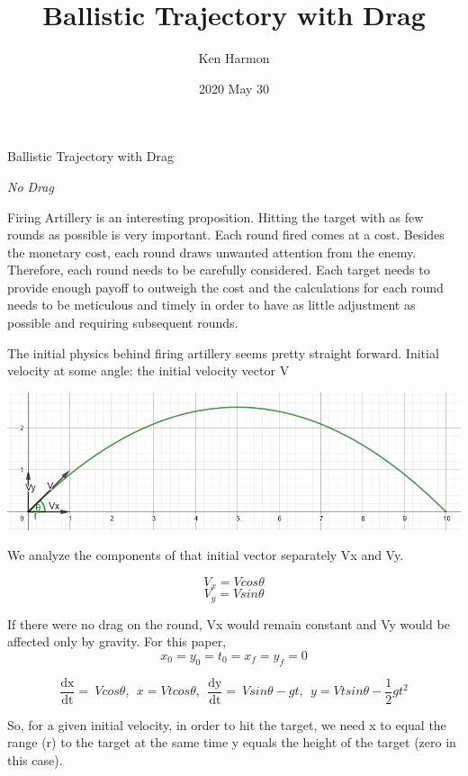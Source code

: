\documentclass[
]{article}
\title{Ballistic Trajectory with Drag}
\author{Ken Harmon}
\date{2020 May 30}
\begin{document}
\maketitle

\hypertarget{section}{%
\section{}\label{section}}

Ballistic Trajectory with Drag

\emph{No Drag}

Firing Artillery is an interesting proposition. Hitting the target with
as few rounds as possible is very important. Each round fired comes at a
cost. Besides the monetary cost, each round draws unwanted attention
from the enemy. Therefore, each round needs to be carefully considered.
Each target needs to provide enough payoff to outweigh the cost and the
calculations for each round needs to be meticulous and timely in order
to have as little adjustment as possible and requiring subsequent
rounds.

The initial physics behind firing artillery seems pretty straight
forward. Initial velocity at some angle: the initial velocity vector V

\includegraphics{media/bdc6aece00f34d9fb2f177df1c70e766.png}

We analyze the components of that initial vector separately Vx and Vy.

\[V_{x} = Vcos\theta\] \[V_{y} = Vsin\theta\]

If there were no drag on the round, Vx would remain constant and Vy
would be affected only by gravity. For this paper,
\[x_{0} = y_{0} = t_{0} = x_{f} =
y_{f} = 0\]

\[\frac{\text{dx}}{\text{dt}} = \ Vcos\theta,\ \ x = Vtcos\theta,\ \
\frac{\text{dy}}{\text{dt}} = \ Vsin\theta - gt,\ \ y = Vtsin\theta -
\frac{1}{2}gt^{2}\]

So, for a given initial velocity, in order to hit the target, we need x
to equal the range (r) to the target at the same time y equals the
height of the target (zero in this case).
\end{document}

